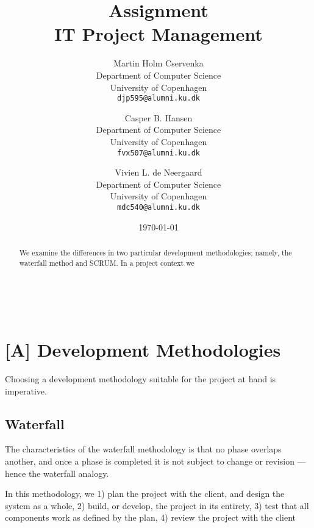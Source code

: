 \documentclass[11pt]{article}
\title
{
    Assignment \assignmentnumber\\
    {\large IT Project Management}
}
\author
{
    Martin Holm Cservenka\\
    Department of Computer Science\\
    University of Copenhagen\\
    {\tt djp595@alumni.ku.dk}
    \and
    Casper B. Hansen\\
    Department of Computer Science\\
    University of Copenhagen\\
    {\tt fvx507@alumni.ku.dk}
    \and
    Vivien L. de Neergaard\\
    Department of Computer Science\\
    University of Copenhagen\\
    {\tt mdc540@alumni.ku.dk}
}
\date{\today}
\newcommand{\colbreak}{\vfill{\ }\columnbreak}
\begin{document}
\maketitle
\begin{multicols}{2}
    \begin{abstract}
    We examine the differences in two particular development methodologies; namely, the waterfall method and SCRUM. In a project context we 
    \end{abstract}
\colbreak
    \tableofcontents
\end{multicols}
\thispagestyle{empty}
\clearpage

\section{[A] Development Methodologies}
\label{sec:A}
Choosing a development methodology suitable for the project at hand is imperative.

\subsection{Waterfall}
\label{sec:A|sub:waterfall}
The characteristics of the waterfall methodology is that no phase overlaps another, and once a phase is completed it is not subject to change or revision --- hence the waterfall analogy.

In this methodology, we 1) plan the project with the client, and design the system as a whole, 2) build, or develop, the project in its entirety, 3) test that all components work as defined by the plan, 4) review the project with the client

\end{document}
